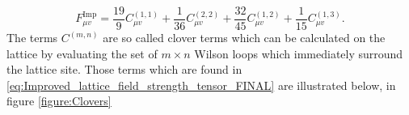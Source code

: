 \documentclass[a4paper,10pt]{article}
\begin{document}
\begin{equation}\label{eq:Improved_lattice_field_strength_tensor_FINAL}
F_{\mu v}^{\operatorname{Imp}}=\frac{19}{9} C_{\mu v}^{(1,1)}+\frac{1}{36} C_{\mu v}^{(2,2)}+\frac{32}{45} C_{\mu v}^{(1,2)}+\frac{1}{15} C_{\mu v}^{(1,3)}.
\end{equation}
The terms $C^{(m,n)}$ are so called clover terms which can be calculated on the lattice by evaluating the set of $m\times n$ Wilson loops which immediately surround the lattice site. Those terms which are found in \eqref{eq:Improved_lattice_field_strength_tensor_FINAL} are illustrated below, in figure \ref{figure:Clovers}
\end{document}
